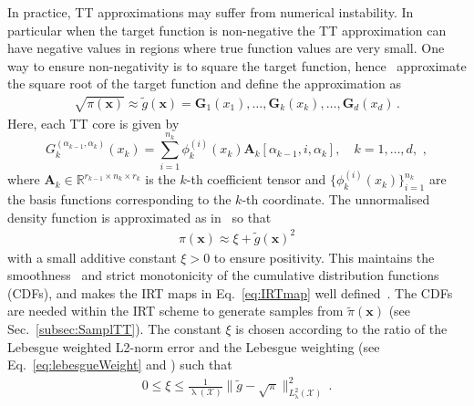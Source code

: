 In practice, TT approximations may suffer from numerical instability.
In particular when the target function is non-negative the TT approximation can have negative values in regions where true function values are very small.
One way to ensure non-negativity is to square the target function, hence~\cite{cui2022deep} approximate the square root of the target function and 
define the approximation as \cite[Eq.~18]{cui2022deep}
\begin{align}
	\sqrt{\pi(\bm{x})} \approx \tilde{g}(\bm{x}) = \bm{G}_1(x_1), \dots, \bm{G}_k(x_k), \dots, \bm{G}_d(x_d)\, .
\end{align}
Here, each TT core is given by \cite[Eq.~21]{cui2022deep}
\begin{equation}
	G^{(\alpha_{k-1},\alpha_k)}_k(x_k) = \sum_{i=1}^{n_k} \phi^{(i)}_k(x_k) \bm{A}_k[\alpha_{k-1}, i, \alpha_k], \quad k = 1, \dots, d,\, \,  ,
\end{equation}
where $\bm{A}_k \in \mathbb{R}^{r_{k-1} \times n_k \times r_k}$ is the $k$-th coefficient tensor and $\{\phi^{(i)}_k(x_k)\}_{i=1}^{n_k}$ are the basis functions corresponding to the $k$-th coordinate.
The unnormalised density function is approximated as in~\cite[Eq.~19]{cui2022deep} so that
\begin{align}
	\pi(\bm{x}) \approx \xi + \tilde{g}(\bm{x})^2 \label{eq:SQTTapprox}
\end{align}
with a small additive constant $\xi > 0$ to ensure positivity.
This maintains the smoothness~\cite{cui2022deep} and strict monotonicity of the cumulative distribution functions (CDFs), and makes the IRT maps in Eq.~\ref{eq:IRTmap} well defined~\cite{foxRosen21}.
The CDFs are needed within the IRT scheme to generate samples from $\tilde{\pi}(\bm{x})$ (see Sec.~\ref{subsec:SamplTT}).
The constant $\xi$ is chosen according to the ratio of the Lebesgue weighted L2-norm error and the Lebesgue weighting (see Eq.~\ref{eq:lebesgueWeight} and \cite[Eq.~35]{cui2022deep}) such that 
\begin{align}
	0 \leq \xi \leq \frac{1}{\uplambda(\mathcal{X})} \lVert \tilde{g} - \sqrt{\pi} \rVert_{L^2_{\uplambda}(\mathcal{X})}^2\,  \label{eq:gamErr}.
\end{align}
